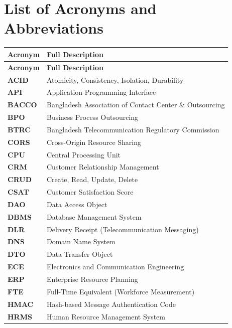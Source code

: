 \chapter*{List of Acronyms and Abbreviations}

\begin{singlespace}
\begin{longtable}{ll}
\toprule
\textbf{Acronym} & \textbf{Full Description} \\
\midrule
\endfirsthead
\toprule
\textbf{Acronym} & \textbf{Full Description} \\
\midrule
\endhead
\bottomrule
\endfoot

\textbf{ACID} & Atomicity, Consistency, Isolation, Durability \\
\textbf{API} & Application Programming Interface \\
\textbf{BACCO} & Bangladesh Association of Contact Center \& Outsourcing \\
\textbf{BPO} & Business Process Outsourcing \\
\textbf{BTRC} & Bangladesh Telecommunication Regulatory Commission \\
\textbf{CORS} & Cross-Origin Resource Sharing \\
\textbf{CPU} & Central Processing Unit \\
\textbf{CRM} & Customer Relationship Management \\
\textbf{CRUD} & Create, Read, Update, Delete \\
\textbf{CSAT} & Customer Satisfaction Score \\
\textbf{DAO} & Data Access Object \\
\textbf{DBMS} & Database Management System \\
\textbf{DLR} & Delivery Receipt (Telecommunication Messaging) \\
\textbf{DNS} & Domain Name System \\
\textbf{DTO} & Data Transfer Object \\
\textbf{ECE} & Electronics and Communication Engineering \\
\textbf{ERP} & Enterprise Resource Planning \\
\textbf{FTE} & Full-Time Equivalent (Workforce Measurement) \\
\textbf{HMAC} & Hash-based Message Authentication Code \\
\textbf{HRMS} & Human Resource Management System \\

\end{longtable}
\end{singlespace}

